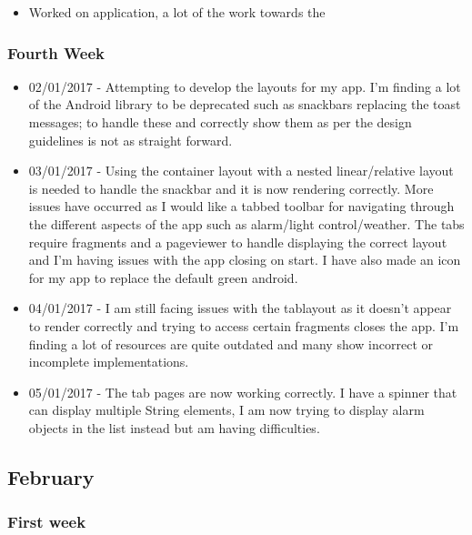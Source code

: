 \begin{itemize}
\tightlist
\item
  Worked on application, a lot of the work towards the
\end{itemize}

\subsubsection{Fourth Week}\label{fourth-week-2}

\begin{itemize}
\tightlist
\item
  02/01/2017 - Attempting to develop the layouts for my app. I'm finding
  a lot of the Android library to be deprecated such as snackbars
  replacing the toast messages; to handle these and correctly show them
  as per the design guidelines is not as straight forward.
\item
  03/01/2017 - Using the container layout with a nested linear/relative
  layout is needed to handle the snackbar and it is now rendering
  correctly. More issues have occurred as I would like a tabbed toolbar
  for navigating through the different aspects of the app such as
  alarm/light control/weather. The tabs require fragments and a
  pageviewer to handle displaying the correct layout and I'm having
  issues with the app closing on start. I have also made an icon for my
  app to replace the default green android.
\item
  04/01/2017 - I am still facing issues with the tablayout as it doesn't
  appear to render correctly and trying to access certain fragments
  closes the app. I'm finding a lot of resources are quite outdated and
  many show incorrect or incomplete implementations.
\item
  05/01/2017 - The tab pages are now working correctly. I have a spinner
  that can display multiple String elements, I am now trying to display
  alarm objects in the list instead but am having difficulties.
\end{itemize}

\subsection{February}\label{february}

\subsubsection{First week}\label{first-week-4}

